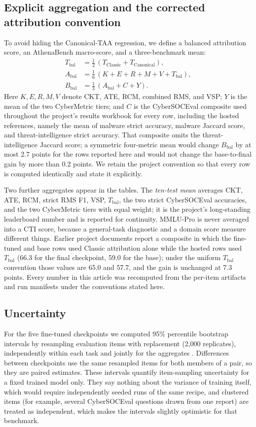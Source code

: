 \documentclass[a4paper,fleqn]{cas-dc}
\newcommand{\Abal}{A_{\mathrm{bal}}}
\newcommand{\Bbal}{B_{\mathrm{bal}}}
\newcommand{\Tbal}{T_{\mathrm{bal}}}
\begin{document}
\subsection{Explicit aggregation and the corrected attribution convention}\label{sec:aggregation}
To avoid hiding the Canonical-TAA regression, we define a balanced attribution score, an AthenaBench macro-score, and a three-benchmark mean:
\begin{align}
 \Tbal &= \tfrac12\,(T_{\mathrm{Classic}}+T_{\mathrm{Canonical}}),\\
 \Abal &= \tfrac16\,(K+E+R+M+V+\Tbal),\\
 \Bbal &= \tfrac13\,(\Abal+C+Y).
\end{align}
Here $K,E,R,M,V$ denote CKT, ATE, RCM, combined RMS, and VSP; $Y$ is the mean of the two CyberMetric tiers; and $C$ is the CyberSOCEval composite used throughout the project's results workbook for every row, including the hosted references, namely the mean of malware strict accuracy, malware Jaccard score, and threat-intelligence strict accuracy. That composite omits the threat-intelligence Jaccard score; a symmetric four-metric mean would change $\Bbal$ by at most 2.7 points for the rows reported here and would not change the base-to-final gain by more than 0.2 points. We retain the project convention so that every row is computed identically and state it explicitly.

Two further aggregates appear in the tables. The \emph{ten-test mean} averages CKT, ATE, RCM, strict RMS F1, VSP, $\Tbal$, the two strict CyberSOCEval accuracies, and the two CyberMetric tiers with equal weight; it is the project's long-standing leaderboard number and is reported for continuity. MMLU-Pro is never averaged into a CTI score, because a general-task diagnostic and a domain score measure different things. Earlier project documents report a composite in which the fine-tuned and base rows used Classic attribution alone while the hosted rows used $\Tbal$ (66.3 for the final checkpoint, 59.0 for the base); under the uniform $\Tbal$ convention those values are 65.0 and 57.7, and the gain is unchanged at 7.3 points. Every number in this article was recomputed from the per-item artifacts and run manifests under the conventions stated here.

\subsection{Uncertainty}\label{sec:uncertainty}
For the five fine-tuned checkpoints we computed 95\% percentile bootstrap intervals by resampling evaluation items with replacement (2,000 replicates), independently within each task and jointly for the aggregates \citep{efron1993bootstrap}. Differences between checkpoints use the same resampled items for both members of a pair, so they are paired estimates. These intervals quantify item-sampling uncertainty for a fixed trained model only. They say nothing about the variance of training itself, which would require independently seeded runs of the same recipe, and clustered items (for example, several CyberSOCEval questions drawn from one report) are treated as independent, which makes the intervals slightly optimistic for that benchmark.
\end{document}
